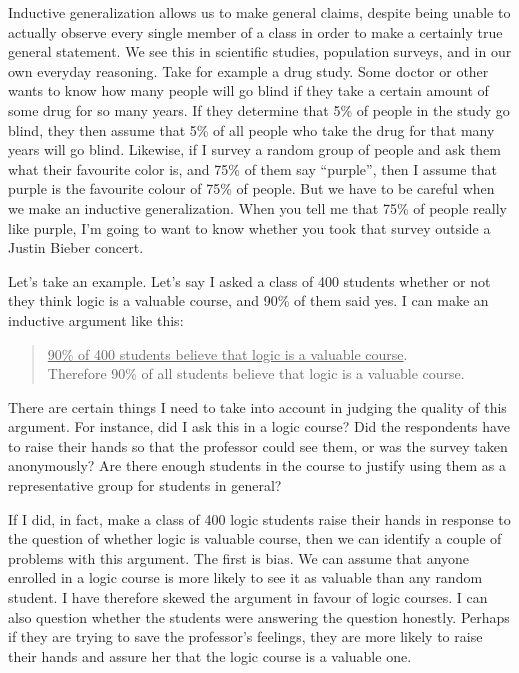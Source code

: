Inductive generalization allows us to make general
claims, despite being unable to actually observe every
single member of a class in order to make a certainly
true general statement. We see this in scientific studies,
population surveys, and in our own everyday reasoning. Take for example a drug study. Some doctor or
other wants to know how many people will go blind
if they take a certain amount of some drug for so
many years. If they determine that 5\% 
of people in the
study go blind, they then assume that 5\% 
of all people
who take the drug for that many years will go blind.
Likewise, if I survey a random group of people and ask
them what their favourite color is, and 75\% 
of them
say ``purple'', then I assume that purple is the favourite
colour of 75\% 
of people. But we have to be careful
when we make an inductive generalization. When you
tell me that 75\% 
of people really like purple, I'm going
to want to know whether you took that survey outside
a Justin Bieber concert.


     Let's take an example. Let's say I asked a class of
400 students whether or not they think logic is a valuable course, and 90\% 
of them said yes. I can make an
inductive argument like this: \\

\begin{quote}
\underline{90\% of 400 students believe that logic is a valuable
course}. \\
Therefore 90\% of all students believe that logic is a
valuable course. \\
\end{quote}

There are certain things I need to take into
account in judging the quality of this argument.
For instance, did I ask this in a logic course? Did the
respondents have to raise their hands so that the
professor could see them, or was the survey taken
anonymously? Are there enough students in the course
to justify using them as a representative group for
students in general?

If I did, in fact, make a class of 400 logic students
raise their hands in response to the question of
whether logic is valuable course, then we can identify
a couple of problems with this argument. The first is
bias. We can assume that anyone enrolled in a logic
course is more likely to see it as valuable than any
random student. I have therefore skewed the argument
in favour of logic courses. I can also question whether
the students were answering the question honestly. Perhaps if they are trying to save the professor's feelings,
they are more likely to raise their hands and assure her
that the logic course is a valuable one.


